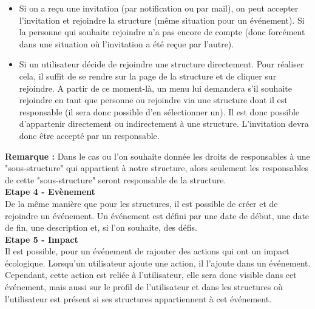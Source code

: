 \begin{itemize}
    \item Si on a reçu une invitation (par notification ou par mail), on peut accepter l'invitation et rejoindre la structure (même situation pour un événement). Si la personne qui souhaite rejoindre n'a pas encore de compte (donc forcément dans une situation où l'invitation a été reçue par l'autre). 
    \item Si un utilisateur décide de rejoindre une structure directement. Pour réaliser cela, il suffit de se rendre sur la page de la structure et de cliquer sur rejoindre. A partir de ce moment-là, un menu lui demandera s'il souhaite rejoindre en tant que personne ou rejoindre via une structure dont il est responsable (il sera donc possible d'en sélectionner un). Il est donc possible d'appartenir directement ou indirectement à une structure. L'invitation devra donc être accepté par un responsable.
\end{itemize}
\textbf{Remarque :} Dans le cas ou l'on souhaite donnée les droits de responsables à une "sous-structure" qui appartient à notre structure, alors seulement les responsables de cette "sous-structure" seront responsable de la structure.\\
\newline 
\textbf{Etape 4 - Evènement}\\
De la même manière que pour les structures, il est possible de créer et de rejoindre un événement. Un événement est défini par une date de début, une date de fin, une description et, si l'on souhaite, des défis. \\
\newline 
\textbf{Etape 5 - Impact}\\
Il est possible, pour un événement de rajouter des actions qui ont un impact écologique. Lorsqu'un utilisateur ajoute une action, il l'ajoute dans un événement. Cependant, cette action est reliée à l'utilisateur, elle sera donc visible dans cet événement, mais aussi sur le profil de l'utilisateur et dans les structures où l'utilisateur est présent si ses structures appartiennent à cet événement. 




